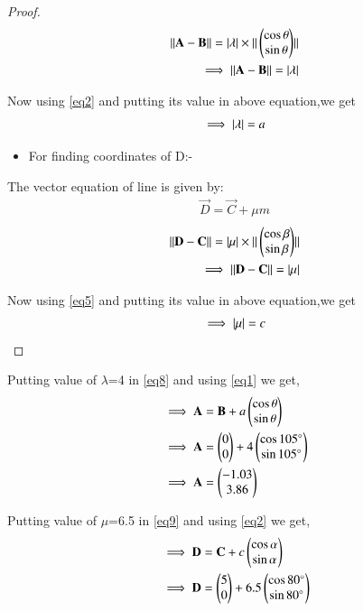 \documentclass[journal,12pt,twocolumn]{IEEEtran}
\begin{document}
\begin{enumerate}
\begin{proof}
\begin{align}
\Vert\mathbf{A}-\mathbf{B}\rVert= \vert\lambda\vert\times\Vert\begin{pmatrix}\cos \theta\\\sin \theta\end{pmatrix}\rVert 
\\
\implies \Vert\mathbf{A}-\mathbf{B}\rVert=\vert\lambda\vert
\end{align}
\item Now using \eqref{eq2} and putting its value in above equation,we get
\begin{align}
\implies \vert\lambda\vert=a \label{eq8}
\end{align}
\begin{itemize}
\item For finding coordinates of D:-
\end{itemize}
The vector equation of line is given by:
\begin{align}
\vec{D}=\vec{C} + \mu m \label{eq9} 
\end{align}
\begin{align}
\Vert\mathbf{D}-\mathbf{C}\rVert = \vert\mu\vert\times\Vert\begin{pmatrix}\cos \beta\\\sin \beta\end{pmatrix}\rVert 
\\
\implies \Vert\mathbf{D}-\mathbf{C}\rVert=\vert\mu\vert
\end{align}
\item Now using \eqref{eq5} and putting its value in above equation,we get
\begin{align}
\implies \vert\mu\vert=c \label{eq10}
\end{align}
\end{proof}
\item Putting value of $\lambda$=4 in \eqref{eq8} and using \eqref{eq1} we get,
\begin{align}
&\implies \mathbf{A}=\mathbf{B} +a\begin{pmatrix}\cos\theta \\\sin \theta \end{pmatrix}
\\
&\implies \mathbf{A}=\begin{pmatrix}0\\0\end{pmatrix} +4\begin{pmatrix}\cos 105 \degree\\\sin 105 \degree\end{pmatrix} 
\\
&\implies \mathbf{A}=\begin{pmatrix}-1.03\\3.86\end{pmatrix}
\end{align}
\item Putting value of $\mu$=6.5 in \eqref{eq9} and using \eqref{eq2} we get,
\begin{align}
&\implies \vec{D}=\vec{C} +c\myvec{\cos\alpha \\\sin \alpha }
\\
&\implies \vec{D}=\myvec{5\\0} +6.5\myvec{\cos 80 \degree\\\sin 80 \degree} 

\end{align}
\end{enumerate}
\end{document}
